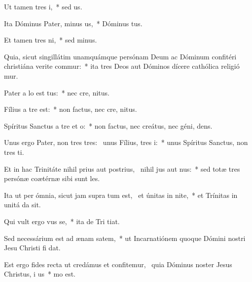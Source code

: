 \item Ut tamen  tres i,~* sed   us.
\item Ita Dóminus Pater, minus us,~* Dóminus  tus.
\item Et tamen  tres ni,~* sed   minus.
\item Quia, sicut singillátim unamquámque persónam Deum ac Dóminum confitéri christiána verite commur:~* ita tres Deos aut Dóminos dícere cathólica religió mur.
\item Pater a lo est tus:~* nec cre,  nitus.
\item Fílius a tre  est:~* non factus, nec cre,  nitus.
\item Spíritus Sanctus a tre et o:~* non factus, nec creátus, nec géni,  dens.
\item Unus ergo Pater, non tres tres:~\pscross{} unus Fílius,  tres i:~* unus Spíritus Sanctus, non tres  ti.
\item Et in hac Trinitáte nihil prius aut postrius,~\pscross{} nihil jus aut nus:~* sed totæ tres persónæ coætérnæ sibi sunt  les.
\item Ita ut per ómnia, sicut jam supra tum est,~\pscross{} et únitas in nite,~* et Trínitas in unitá da sit.
\item Qui vult ergo vus se,~* ita de Tri tiat.
\item Sed necessárium est ad ænam satem,~* ut Incarnatiónem quoque Dómini nostri Jesu Christi fi dat.
\item Est ergo fides recta ut credámus et confitemur,~\pscross{} quia Dóminus noster Jesus Christus, i us~*   mo est.
